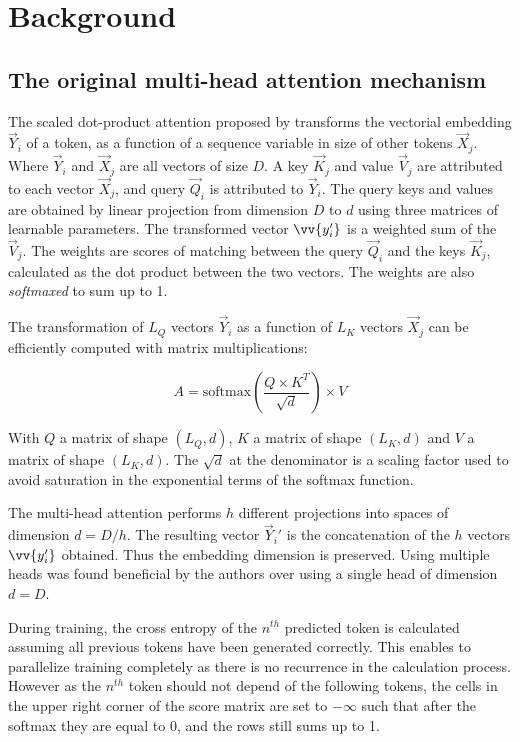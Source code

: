\section{Background}

\subsection{The original multi-head attention mechanism}

The scaled dot-product attention proposed by
\citet{vaswani2017attention} transforms the vectorial embedding $\vec{Y}_i$ of a token, as a
 function of a sequence variable in size of other tokens $\vec{X}_j$. Where
 $\vec{Y}_i$ and $\vec{X}_j$ are all vectors of size $D$. A key
$\vec{K}_j$ and value $\vec{V}_j$ are attributed to each vector
$\vec{X}_j$, and query $\vec{Q}_i$ is attributed to $\vec{Y}_i$.
 The query keys and values are obtained by linear projection from dimension $D$ to $d$ using three matrices of learnable parameters. The transformed vector
 $\vv{y_i'}$ is a weighted sum of the $\vec{V}_j$. The weights are
 scores of matching between the query $\vec{Q}_i$ and the keys
$\vec{K}_j$, calculated as the dot product between the two vectors.
The weights are also \emph{softmaxed} to sum up to 1. 

The transformation of $L_Q$
vectors $\vec{Y}_i$ as a function of $L_K$ vectors $\vec{X}_j$ can be efficiently computed with matrix multiplications:

\begin{equation}
A = \mathrm{softmax}\left(\frac{Q \times K^T}{\sqrt{d}}\right) \times V
\end{equation}

With $Q$ a matrix of shape $(L_Q, d)$, $K$ a matrix of shape
 $(L_K, d)$ and $V$ a matrix of shape $(L_K, d)$. The $\sqrt{d}$
at the denominator is a scaling factor used to avoid saturation in the
exponential terms of the softmax function.

The multi-head attention performs $h$ different projections into spaces
 of dimension $d = D/h$. The resulting vector $\vec{Y}_i'$ is the
concatenation of the $h$ vectors $\vv{y_i'}$ obtained. Thus the
embedding dimension is preserved. Using multiple heads was found
beneficial by the authors over using a single head of dimension
$d = D$.

During training, the cross entropy of the $n^{th}$ predicted token is
 calculated assuming all previous tokens have been generated correctly.
 This enables to parallelize training completely as there is no
recurrence in the calculation process. However as the $n^{th}$ token should not depend of the
following tokens, the cells in the upper right corner of the score
matrix are set to $-\infty$ such that after the softmax they are equal
to 0, and the rows still sums up to 1.

